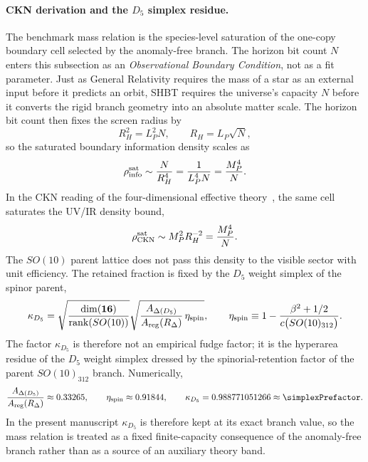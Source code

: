 \documentclass[11pt]{article}
\begin{document}
\paragraph{CKN derivation and the $D_5$ simplex residue.}
The benchmark mass relation is the species-level saturation of the one-copy boundary cell selected by the anomaly-free branch. The horizon bit count $N$ enters this subsection as an \emph{Observational Boundary Condition}, not as a fit parameter. Just as General Relativity requires the mass of a star as an external input before it predicts an orbit, SHBT requires the universe's capacity $N$ before it converts the rigid branch geometry into an absolute matter scale. The horizon bit count then fixes the screen radius by
\begin{equation}
 R_H^2=L_P^2N,
 \qquad
 R_H=L_P\sqrt{N},
\end{equation}
so the saturated boundary information density scales as
\begin{equation}
 \rho_{\rm info}^{\rm sat}
 \sim
 \frac{N}{R_H^4}
 =
 \frac{1}{L_P^4N}
 =
 \frac{M_P^4}{N}.
\end{equation}
In the CKN reading of the four-dimensional effective theory~\cite{cohen1999}, the same cell saturates the UV/IR density bound,
\begin{equation}
 \rho_{\rm CKN}^{\rm sat}
 \sim
 M_P^2R_H^{-2}
 =
 \frac{M_P^4}{N}.
\end{equation}
The $SO(10)$ parent lattice does not pass this density to the visible sector with unit efficiency. The retained fraction is fixed by the $D_5$ weight simplex of the spinor parent,
\begin{equation}
 \kappa_{D_5}
 =
 \sqrt{\frac{\dim(\mathbf{16})}{\operatorname{rank}(SO(10))}}
 \sqrt{\frac{A_{\Delta(D_5)}}{A_{\rm reg}(R_{\Delta})}\,\eta_{\rm spin}},
 \qquad
 \eta_{\rm spin}\equiv 1-\frac{\beta^2+1/2}{c\bigl(SO(10)_{312}\bigr)}.
\end{equation}
The factor $\kappa_{D_5}$ is therefore not an empirical fudge factor; it is the hyperarea residue of the $D_5$ weight simplex dressed by the spinorial-retention factor of the parent $SO(10)_{312}$ branch. Numerically,
\begin{equation}
 \frac{A_{\Delta(D_5)}}{A_{\rm reg}(R_{\Delta})}\approx0.33265,
 \qquad
 \eta_{\rm spin}\approx0.91844,
 \qquad
 \kappa_{D_5}=0.988771051266\approx\simplexPrefactor.
\end{equation}
In the present manuscript $\kappa_{D_5}$ is therefore kept at its exact branch value, so the mass relation is treated as a fixed finite-capacity consequence of the anomaly-free branch rather than as a source of an auxiliary theory band.
\end{document}
